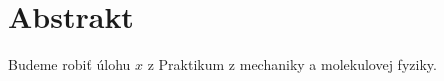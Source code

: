 \section*{Abstrakt}

Budeme robiť úlohu $x$ z Praktikum z mechaniky a molekulovej fyziky\cite{zrubáková2003praktikum}. \lipsum[1]